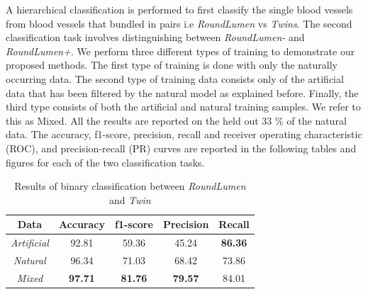 A hierarchical classification is performed to first classify the single blood vessels from blood vessels that bundled in pairs i.e \textit{RoundLumen} vs \textit{Twins}. The second classification task involves distinguishing between \textit{RoundLumen-} and \textit{RoundLumen+}. We perform three different types of training to demonstrate our proposed methods. The first type of training is done with only the naturally occurring data. The second type of training data consists only of the artificial data that has been filtered by the natural model as explained before. Finally, the third type consists of both the artificial and natural training samples. We refer to this as Mixed. All the results are reported on the held out 33 \% of the natural data. The accuracy, f1-score, precision, recall and receiver operating characteristic (ROC), and precision-recall (PR) curves are reported in the following tables and figures for each of the two classification tasks. 

\begin{table}[ht!]
\centering
\caption{Results of binary classification between \textit{RoundLumen} and \textit{Twin}}
\begin{tabular}{ | c | c | c | c | c |} 
\hline
Data & Accuracy & f1-score & Precision & Recall \\ 
\hline
\textit{Artificial} & 92.81& 59.36	& 45.24 & \textbf{86.36} \\ 
\hline
\textit{Natural} & 96.34& 71.03& 68.42& 73.86 \\
\hline
\textit{Mixed} & \textbf{97.71} & \textbf{81.76} & \textbf{79.57} & 84.01 \\
\hline
\end{tabular}
\label{table:results}
\end{table}


